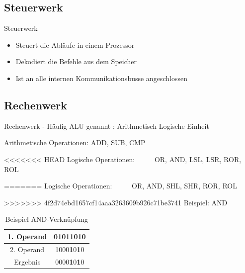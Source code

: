 \documentclass{beamer}
\begin{document}
\subsection{Steuerwerk}
\begin{frame}{Steuerwerk}
\begin{itemize}


\item{Steuert die Abl\"aufe in einem Prozessor}
\bigskip
\item{Dekodiert die Befehle aus dem Speicher}
\bigskip
\item{Ist an alle internen Kommunikationsbusse angeschlossen}
\end{itemize}
\end{frame}



\subsection{Rechenwerk}
\begin{frame}[t]{Rechenwerk}
- H\"aufig ALU genannt : Arithmetisch Logische Einheit \par \bigskip
Arithmetische Operationen: ADD, SUB, CMP\newline\par
<<<<<<< HEAD
Logische Operationen: \ \ \ \ \ OR, AND, LSL, LSR, ROR, ROL \par
=======
Logische Operationen: \ \ \ \ \ OR, AND, SHL, SHR, ROR, ROL \par
>>>>>>> 4f2d74ebd1657cf14aaa3263609b926c71be3741
\pause\bigskip
Beispiel: AND 
\begin{table}[]
\begin{tabular}{|c|c|}
\hline
1. Operand & 0101\textbf{1}0\textbf{1}0 \\ \hline
2. Operand & 1000\textbf{1}0\textbf{1}0 \\ \hline\hline
Ergebnis   & 0000\textbf{1}0\textbf{1}0 \\ \hline
\end{tabular}
\centering
\caption{Beispiel AND-Verkn\"upfung}
\end{table}
\end{frame}
\end{document}

